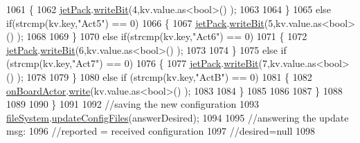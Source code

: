 \begin{DoxyCode}
1061                     \{
1062                         \hyperlink{class_cool_board_a30b1357881b01ccbec676856a91e48e9}{jetPack}.\hyperlink{class_jetpack_a79ae7bc3c1828a0551a7c005c4f8bd00}{writeBit}(4,kv.value.as<\textcolor{keywordtype}{bool}>() ); 
1063 
1064                     \}
1065                     \textcolor{keywordflow}{else} \textcolor{keywordflow}{if}(strcmp(kv.key,\textcolor{stringliteral}{"Act5"}) == 0)
1066                     \{
1067                         \hyperlink{class_cool_board_a30b1357881b01ccbec676856a91e48e9}{jetPack}.\hyperlink{class_jetpack_a79ae7bc3c1828a0551a7c005c4f8bd00}{writeBit}(5,kv.value.as<\textcolor{keywordtype}{bool}>() ); 
1068 
1069                     \}
1070                     \textcolor{keywordflow}{else} \textcolor{keywordflow}{if}(strcmp(kv.key,\textcolor{stringliteral}{"Act6"}) == 0)
1071                     \{
1072                         \hyperlink{class_cool_board_a30b1357881b01ccbec676856a91e48e9}{jetPack}.\hyperlink{class_jetpack_a79ae7bc3c1828a0551a7c005c4f8bd00}{writeBit}(6,kv.value.as<\textcolor{keywordtype}{bool}>() ); 
1073 
1074                     \}
1075                     \textcolor{keywordflow}{else} \textcolor{keywordflow}{if} (strcmp(kv.key,\textcolor{stringliteral}{"Act7"}) == 0)
1076                     \{
1077                         \hyperlink{class_cool_board_a30b1357881b01ccbec676856a91e48e9}{jetPack}.\hyperlink{class_jetpack_a79ae7bc3c1828a0551a7c005c4f8bd00}{writeBit}(7,kv.value.as<\textcolor{keywordtype}{bool}>() ); 
1078 
1079                     \}
1080                     \textcolor{keywordflow}{else} \textcolor{keywordflow}{if} (strcmp(kv.key,\textcolor{stringliteral}{"ActB"}) == 0)
1081                     \{
1082                         \hyperlink{class_cool_board_a4ac693895c21025b8808653f2a4316e6}{onBoardActor}.\hyperlink{class_cool_board_actor_a958786ff01ea1056ee72c72d439f86da}{write}(kv.value.as<\textcolor{keywordtype}{bool}>() ); 
1083 
1084                     \}
1085                                 
1086                 
1087                 \}
1088 
1089                 
1090             \}
1091 
1092             \textcolor{comment}{//saving the new configuration}
1093             \hyperlink{class_cool_board_a42c2586fbb13ff7f06538e9284e8538d}{fileSystem}.\hyperlink{class_cool_file_system_adfa8e2e80641ae6f0cceabd348a9b841}{updateConfigFiles}(answerDesired);
1094 
1095                 \textcolor{comment}{//answering the update msg:}
1096             \textcolor{comment}{//reported = received configuration}
1097             \textcolor{comment}{//desired=null}
1098         

\end{DoxyCode}
